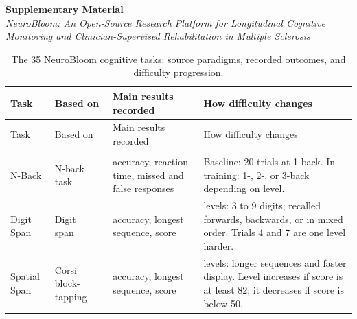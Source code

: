 \documentclass[11pt,a4paper]{article}
\begin{document}


\begin{center}
{\Large\bfseries Supplementary Material}\\[0.6em]
{\normalsize\itshape NeuroBloom: An Open-Source Research Platform for Longitudinal
Cognitive Monitoring and Clinician-Supervised Rehabilitation in Multiple Sclerosis}
\end{center}

\small
\setlength{\tabcolsep}{4pt}
\renewcommand{\arraystretch}{1.2}
\setlength{\LTcapwidth}{\textwidth}

\begin{longtable}{
>{\raggedright\arraybackslash}p{2.9cm}
>{\raggedright\arraybackslash}p{3.2cm}
>{\raggedright\arraybackslash}p{4.2cm}
>{\raggedright\arraybackslash}p{5.5cm}
}

\caption{The 35 NeuroBloom cognitive tasks: source paradigms, recorded
outcomes, and difficulty progression.}
\label{tab:tasks}\\

\toprule
Task & Based on & Main results recorded & How difficulty changes \\
\midrule
\endfirsthead

\toprule
Task & Based on & Main results recorded & How difficulty changes \\
\midrule
\endhead

\bottomrule
\endfoot

\bottomrule
\endlastfoot

\multicolumn{4}{l}{\textbf{Working memory}} \\*

N-Back
& N-back task~\cite{R1}
& accuracy, reaction time, missed and false responses
& Baseline: 20 trials at 1-back. In training: 1-, 2-, or 3-back depending on level. \\

Digit Span
& Digit span~\cite{R2}
& accuracy, longest sequence, score
& 10 levels: 3 to 9 digits; recalled forwards, backwards, or in mixed order. Trials 4 and 7 are one level harder. \\

Spatial Span
& Corsi block-tapping~\cite{R3}
& accuracy, longest sequence, score
& 10 levels: longer sequences and faster display. Level increases if score is
at least 82; it decreases if score is below 50. \\


\end{longtable}
\end{document}
